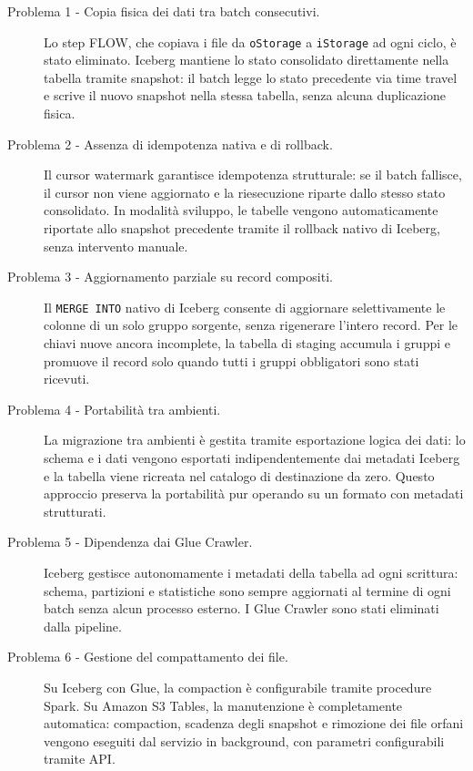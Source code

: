 \documentclass[12pt,a4paper,openright,twoside]{book}
\begin{document}
\begin{description}

    \item[Problema 1 - Copia fisica dei dati tra batch consecutivi.]
    Lo step FLOW, che copiava i file da \texttt{oStorage} a \texttt{iStorage} ad ogni ciclo, è stato eliminato. Iceberg mantiene lo stato consolidato direttamente nella tabella tramite snapshot: il batch legge lo stato precedente via time travel e scrive il nuovo snapshot nella stessa tabella, senza alcuna duplicazione fisica.

    \item[Problema 2 - Assenza di idempotenza nativa e di rollback.]
    Il cursor watermark garantisce idempotenza strutturale: se il batch fallisce, il cursor non viene aggiornato e la riesecuzione riparte dallo stesso stato consolidato. In modalità sviluppo, le tabelle vengono automaticamente riportate allo snapshot precedente tramite il rollback nativo di Iceberg, senza intervento manuale.

    \item[Problema 3 - Aggiornamento parziale su record compositi.]
    Il \texttt{MERGE INTO} nativo di Iceberg consente di aggiornare selettivamente le colonne di un solo gruppo sorgente, senza rigenerare l'intero record. Per le chiavi nuove ancora incomplete, la tabella di staging accumula i gruppi e promuove il record solo quando tutti i gruppi obbligatori sono stati ricevuti.

    \item[Problema 4 - Portabilità tra ambienti.]
    La migrazione tra ambienti è gestita tramite esportazione logica dei dati: lo schema e i dati vengono esportati indipendentemente dai metadati Iceberg e la tabella viene ricreata nel catalogo di destinazione da zero. Questo approccio preserva la portabilità pur operando su un formato con metadati strutturati.

    \item[Problema 5 - Dipendenza dai Glue Crawler.]
    Iceberg gestisce autonomamente i metadati della tabella ad ogni scrittura: schema, partizioni e statistiche sono sempre aggiornati al termine di ogni batch senza alcun processo esterno. I Glue Crawler sono stati eliminati dalla pipeline.

    \item[Problema 6 - Gestione del compattamento dei file.]
    Su Iceberg con Glue, la compaction è configurabile tramite procedure Spark. Su Amazon S3 Tables, la manutenzione è completamente automatica: compaction, scadenza degli snapshot e rimozione dei file orfani vengono eseguiti dal servizio in background, con parametri configurabili tramite API.

\end{description}
\end{document}
